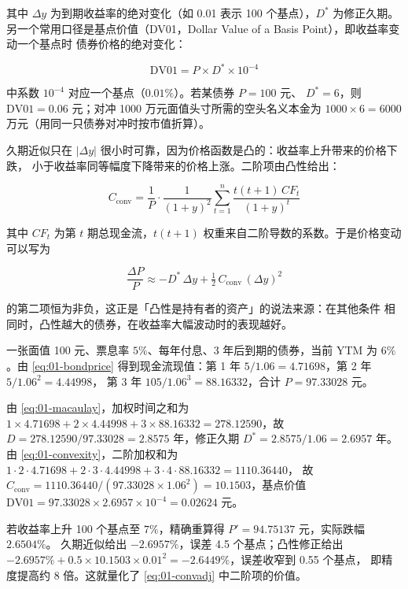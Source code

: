 其中 $\Delta y$ 为到期收益率的绝对变化（如 0.01 表示 100 个基点），$D^{*}$ 为修正久期。
另一个常用口径是基点价值（DV01，Dollar Value of a Basis Point），即收益率变动一个基点时
债券价格的绝对变化：

\begin{equation}\label{eq:01-dv01}
  \mathrm{DV01} = P \times D^{*} \times 10^{-4}
\end{equation}

 中系数 $10^{-4}$ 对应一个基点（$0.01\%$）。若某债券 $P = 100$ 元、
$D^{*} = 6$，则 $\mathrm{DV01} = 0.06$ 元；对冲 1000 万元面值头寸所需的空头名义本金为
$1000 \times 6 = 6000$ 万元（用同一只债券对冲时按市值折算）。

久期近似只在 $|\Delta y|$ 很小时可靠，因为价格函数是凸的：收益率上升带来的价格下跌，
小于收益率同等幅度下降带来的价格上涨。二阶项由凸性给出：

\begin{equation}\label{eq:01-convexity}
  C_{\text{conv}} = \frac{1}{P}\cdot\frac{1}{(1+y)^2}\sum_{t=1}^{n}\frac{t(t+1)\,CF_t}{(1+y)^t}
\end{equation}

其中 $CF_t$ 为第 $t$ 期总现金流，$t(t+1)$ 权重来自二阶导数的系数。于是价格变动可以写为

\begin{equation}\label{eq:01-convadj}
  \frac{\Delta P}{P} \approx -D^{*}\,\Delta y + \tfrac{1}{2}\,C_{\text{conv}}\,(\Delta y)^2
\end{equation}

 的第二项恒为非负，这正是「凸性是持有者的资产」的说法来源：在其他条件
相同时，凸性越大的债券，在收益率大幅波动时的表现越好。

\begin{example}[久期与凸性的数值修正]\label{ex:01-duration}
一张面值 100 元、票息率 $5\%$、每年付息、3 年后到期的债券，当前 YTM 为 $6\%$。由
\cref{eq:01-bondprice} 得到现金流现值：第 1 年 $5/1.06 = 4.71698$，第 2 年 $5/1.06^2 = 4.44998$，
第 3 年 $105/1.06^3 = 88.16332$，合计 $P = 97.33028$ 元。

由 \cref{eq:01-macaulay}，加权时间之和为
$1 \times 4.71698 + 2 \times 4.44998 + 3 \times 88.16332 = 278.12590$，故
$D = 278.12590/97.33028 = 2.8575$ 年，修正久期 $D^{*} = 2.8575/1.06 = 2.6957$ 年。
由 \cref{eq:01-convexity}，二阶加权和为
$1\cdot2\cdot4.71698 + 2\cdot3\cdot4.44998 + 3\cdot4\cdot88.16332 = 1110.36440$，
故 $C_{\text{conv}} = 1110.36440/(97.33028 \times 1.06^2) = 10.1503$，基点价值
$\mathrm{DV01} = 97.33028 \times 2.6957 \times 10^{-4} = 0.02624$ 元。

若收益率上升 100 个基点至 $7\%$，精确重算得 $P' = 94.75137$ 元，实际跌幅 $2.6504\%$。
久期近似给出 $-2.6957\%$，误差 4.5 个基点；凸性修正给出
$-2.6957\% + 0.5 \times 10.1503 \times 0.01^2 = -2.6449\%$，误差收窄到 0.55 个基点，
即精度提高约 8 倍。这就量化了 \cref{eq:01-convadj} 中二阶项的价值。
\end{example}

